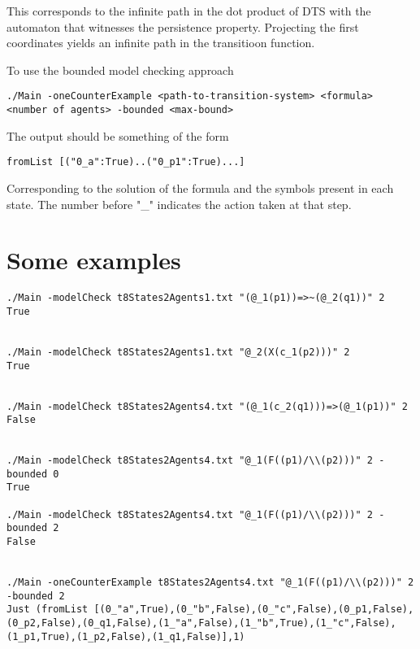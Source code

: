 \documentclass[11pt]{article}
\begin{document}
This corresponds to the infinite path in the dot product of DTS with the
automaton that witnesses the persistence property. Projecting the first
coordinates yields an infinite path in the transitioon function.

To use the bounded model checking approach

\begin{verbatim}
./Main -oneCounterExample <path-to-transition-system> <formula> <number of agents> -bounded <max-bound>
\end{verbatim}

The output should be something of the form

\begin{verbatim}
fromList [("0_a":True)..("0_p1":True)...]
\end{verbatim}

Corresponding to the solution of the formula and the symbols present in each
state. The number before "\_" indicates the action taken at that step.


\section{Some examples}
\label{sec:org3624e08}

\begin{verbatim}
./Main -modelCheck t8States2Agents1.txt "(@_1(p1))=>~(@_2(q1))" 2
True


./Main -modelCheck t8States2Agents1.txt "@_2(X(c_1(p2)))" 2
True


./Main -modelCheck t8States2Agents4.txt "(@_1(c_2(q1)))=>(@_1(p1))" 2
False


./Main -modelCheck t8States2Agents4.txt "@_1(F((p1)/\\(p2)))" 2 -bounded 0
True

./Main -modelCheck t8States2Agents4.txt "@_1(F((p1)/\\(p2)))" 2 -bounded 2
False


./Main -oneCounterExample t8States2Agents4.txt "@_1(F((p1)/\\(p2)))" 2 -bounded 2
Just (fromList [(0_"a",True),(0_"b",False),(0_"c",False),(0_p1,False),(0_p2,False),(0_q1,False),(1_"a",False),(1_"b",True),(1_"c",False),(1_p1,True),(1_p2,False),(1_q1,False)],1)
\end{verbatim}
\end{document}
